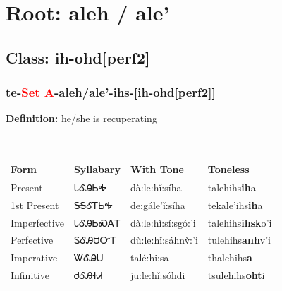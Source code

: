 \needspace{4in}
\section*{Root: aleh / ale'}
\nopagebreak
{}
\needspace{3in}
\subsection*{Class: ih-ohd[perf2]}
\nopagebreak
\needspace{2in}
\subsubsection*{te{-}\textcolor{Red}{Set A}{-}\textbf{aleh/ale'}{-}ihs{-}[ih-ohd[perf2]]}
\nopagebreak
\textbf{Definition: } he/she is recuperating
\\[0.5em]
\begin{tabularx}{\textwidth}{l X X X}%
\toprule%
\textbf{Form}&\textbf{Syllabary}&\textbf{With Tone}&\textbf{Toneless}\\%
\midrule%
Present&ᏓᎴᎯᏏᎭ&dà:le:hǐ:síha&talehihs\textbf{ih}a\\%
1st Present&ᏕᎦᎴᎢᏏᎭ&de:gále’ǐ:síha&tekale'ihs\textbf{ih}a\\%
Imperfective&ᏓᎴᎯᏏᏍᎪᎢ&dà:le:hǐ:sí:sgó:’i&talehihs\textbf{ihsk}o'i\\%
Perfective&ᏚᎴᎯᏌᏅᎢ&dù:le:hǐ:sáhnv̌:’i&tulehihs\textbf{anh}v'i\\%
Imperative&ᏔᎴᎯᏌ&talé:hi:sa&thalehihs\textbf{a}\\%
Infinitive&ᏧᎴᎯᏐᏗ&ju:le:hǐ:sóhdi&tsulehihs\textbf{oht}i\\%
\bottomrule%
\end{tabularx}
\\[1em]